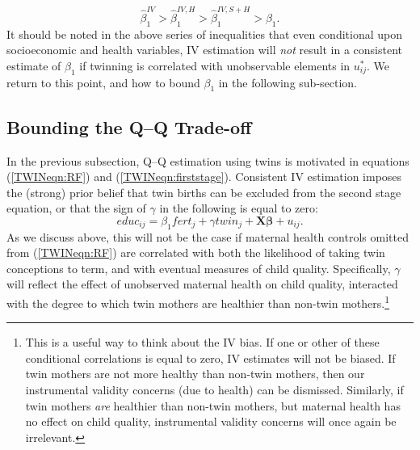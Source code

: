 \begin{equation}
\label{TWINeqn:moves}
\hat\beta_1^{IV}>\hat\beta_1^{IV,H}>\hat\beta_1^{IV,S+H}>\beta_1.
\end{equation}
It should be noted in the above series of inequalities that even conditional upon
socioeconomic and health variables, IV estimation will \emph{not} result in a
consistent estimate of $\beta_1$ if twinning is correlated with unobservable
elements in $u^*_{ij}$.  We return to this point, and how to bound $\beta_1$ in
the following sub-section.

\subsection{Bounding the Q--Q Trade-off}            \label{TWINsscn:methodBounds}
In the previous subsection, Q--Q estimation using twins is motivated in equations 
(\ref{TWINeqn:RF}) and (\ref{TWINeqn:firststage}).  Consistent IV estimation 
imposes the (strong) prior belief that twin births can be excluded from the 
second stage equation, or that the sign of $\gamma$ in the following is equal to 
zero:
\begin{equation}
\label{TWINeqn:Conley}
educ_{ij}=\beta_1 fert_j + \gamma twin_j + \bm{X}\bm{\beta} + u_{ij}.
\end{equation}
As we discuss above, this will not be the case if maternal health controls 
omitted from (\ref{TWINeqn:RF}) are correlated with both the likelihood of 
taking twin conceptions to term, and with eventual measures of child quality.
Specifically, $\gamma$ will reflect the effect of unobserved maternal health on 
child quality, interacted with the degree to which twin mothers are healthier
than non-twin mothers.\footnote{This is a useful way to think about the IV bias.
If one or other of these conditional correlations is equal to zero, IV estimates
will not be biased.  If twin mothers are not more healthy than non-twin mothers,
then our instrumental validity concerns (due to health) can be dismissed.  
Similarly, if twin mothers \emph{are} healthier than non-twin mothers, but 
maternal health has no effect on child quality, instrumental validity concerns 
will once again be irrelevant.}

